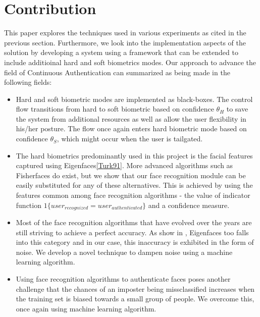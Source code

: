 \documentclass[%
        final,
        notitlepage,
        narroweqnarray,
        inline,
        ]{ieee}
\begin{document}
\section{Contribution} \label{sec:contribution}
This paper explores the techniques used in various experiments as cited in the previous section.
Furthermore, we look into the implementation aspects of the solution by developing a system using a framework that can be extended to include additioinal hard and soft biometrics modes. 
Our approach to advance the field of Continuous Authentication can summarized as being made in the following fields:
\begin{itemize}
	\item Hard and soft biometric modes are implemented as black-boxes. The control flow transitions from hard to soft biometric based on confidence $\theta_{H}$ to save the system from additional resources as well as allow the user flexibility in his/her posture. The flow once again enters hard biometric mode based on confidence $\theta_{S}$, which might occur when the user is tailgated.
	\item The hard biometrics predominantly used in this project is the facial features captured using Eigenfaces\ref{Turk91}. More advanced algorithms such as Fisherfaces do exist, but we show that our face recognition module can be easily substituted for any of these alternatives. This is achieved by using the features common among face recognition algorithms - the value of indicator function $1\{user_{recognized}=user_{authenticated}\}$ and a confidence measure.
	\item Most of the face recognition algorithms that have evolved over the years are still striving to achieve a perfect accuracy. As show in \cite{fig:no_svm}, Eigenfaces too falls into this category and in our case, this inaccuracy is exhibited in the form of noise. We develop a novel technique to dampen noise using a machine learning algorithm.
	\item Using face recognition algorithms to authenticate faces poses another challenge that the chances of an imposter being missclassified increases when the training set is biased towards a small group of people. We overcome this, once again using machine learning algorithm.
\end{itemize}


\end{document}
